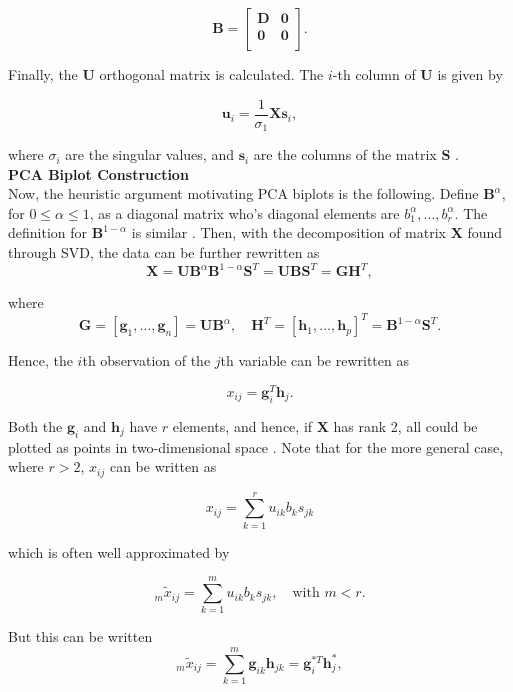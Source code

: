 \documentclass{article}\usepackage[]{graphicx}\usepackage[]{xcolor}
\numberwithin{equation}{section}
\begin{document}
\[
\mathbf{B} = 
\begin{bmatrix}
    \mathbf{D} & \mathbf{0} \\
    \mathbf{0} & \mathbf{0} \\
\end{bmatrix}.
\]

\noindent Finally, the $\mathbf{U}$ orthogonal matrix is calculated. The $i$-th column of $\mathbf{U}$ is given by

\[
\mathbf{u}_i = \frac{1}{\sigma_1}\mathbf{X}\mathbf{s}_i,
\]

\noindent where $\sigma_i$ are the singular values, and $\mathbf{s}_i$ are the columns of the matrix $\mathbf{S}$ \cite{baker2005singular}.\\

\noindent \textbf{PCA Biplot Construction}\\
\noindent Now, the heuristic argument motivating PCA biplots is the following. Define $\mathbf{B}^{\alpha}$, for $0 \leq \alpha \leq 1$, as a diagonal matrix who's diagonal elements are $b_1^{\alpha}, \ldots, b_r^{\alpha}$. The definition for $\mathbf{B}^{1-\alpha}$ is similar \cite{biplotsnotes}. Then, with the decomposition of matrix $\mathbf{X}$ found through SVD, the data can be further rewritten as
\[\mathbf{X} = \mathbf{U}\mathbf{B}^{\alpha}\mathbf{B}^{1-\alpha}\mathbf{S}^{T} = \mathbf{U}\mathbf{B}\mathbf{S}^{T} = \mathbf{G}\mathbf{H}^{T},\]

\noindent where \[\mathbf{G} = [\mathbf{g}_1, \dots , \mathbf{g}_n] = \mathbf{U}\mathbf{B}^\alpha, \quad \mathbf{H}^T = [\mathbf{h}_1, \dots , \mathbf{h}_p]^T = \mathbf{B}^{1-\alpha}\mathbf{S}^T. \]

\noindent Hence, the $i$th observation of the $j$th variable can be rewritten as

\[ x_{ij} = \mathbf{g}_i^T \mathbf{h}_j. \]

\noindent Both the $\mathbf{g}_i$ and $\mathbf{h}_j$ have $r$ elements, and hence, if $\mathbf{X}$ has rank 2, all could be plotted as points in two-dimensional space \cite{biplotsnotes}. Note that for the more general case, where $r > 2$, $x_{ij}$ can be written as

\[
x_{ij} = \sum_{k=1}^{r} u_{ik}b_{k}s_{jk}
\]

\noindent which is often well approximated by

\[
_m\tilde{x}_{ij} = \sum_{k=1}^{m} u_{ik}b_{k}s_{jk}, \quad \text{with } m < r.
\]

\noindent But this can be written
\[
_m\tilde{x}_{ij} = \sum_{k=1}^{m} \mathbf{g}_{ik}\mathbf{h}_{jk} = \mathbf{g}_{i}^{*T}\mathbf{h}_{j}^{*},
\]
\end{document}
